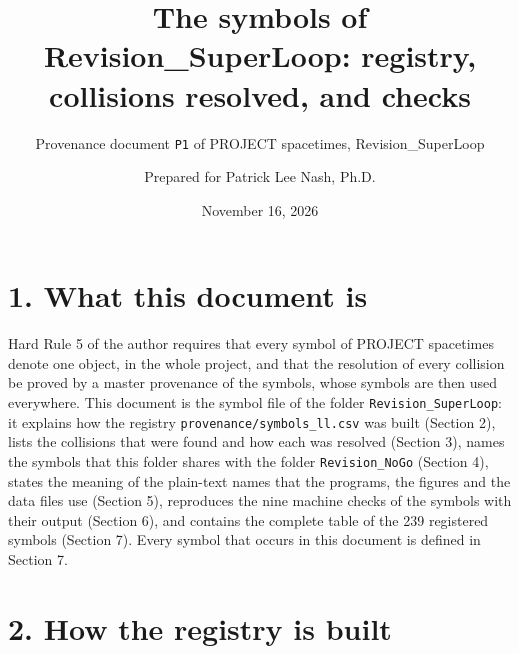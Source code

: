 \documentclass[
  10pt,
]{article}
\title{The symbols of Revision\_SuperLoop: registry, collisions
resolved, and checks}
\subtitle{Provenance document \texttt{P1} of PROJECT spacetimes,
Revision\_SuperLoop}
\author{Prepared for Patrick Lee Nash, Ph.D.}
\date{November 16, 2026}
\begin{document}
\maketitle

\hypertarget{what-this-document-is}{%
\section{1. What this document is}\label{what-this-document-is}}

Hard Rule 5 of the author requires that every symbol of PROJECT
spacetimes denote one object, in the whole project, and that the
resolution of every collision be proved by a master provenance of the
symbols, whose symbols are then used everywhere. This document is the
symbol file of the folder \texttt{Revision\_SuperLoop}: it explains how
the registry \texttt{provenance/symbols\_ll.csv} was built (Section 2),
lists the collisions that were found and how each was resolved (Section
3), names the symbols that this folder shares with the folder
\texttt{Revision\_NoGo} (Section 4), states the meaning of the
plain-text names that the programs, the figures and the data files use
(Section 5), reproduces the nine machine checks of the symbols with
their output (Section 6), and contains the complete table of the 239
registered symbols (Section 7). Every symbol that occurs in this
document is defined in Section 7.

\hypertarget{how-the-registry-is-built}{%
\section{2. How the registry is built}\label{how-the-registry-is-built}}
\end{document}
